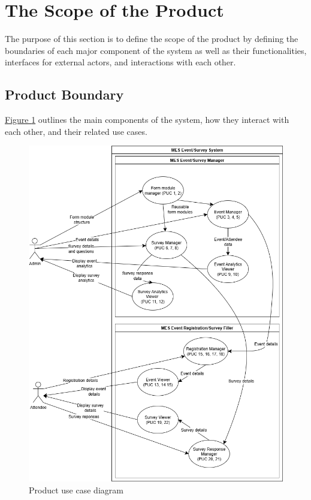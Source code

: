 \documentclass[12pt]{article}
\begin{document}
\section{The Scope of the Product}

The purpose of this section is to define the scope of the product by defining the boundaries of each major component of the system as well as their functionalities, interfaces for external actors, and interactions with each other.

\subsection{Product Boundary}

\hyperref[fig:productusecase]{Figure \ref{fig:productusecase}} outlines the main components of the system, how they interact with each other, and their related use cases.

\begin{center}
\begin{figure}[H]
    \centering
    \includegraphics[width=0.89\linewidth]{images/product_use_case.png}
    \caption{Product use case diagram}\label{fig:productusecase}
\end{figure}
\end{center}
\end{document}
